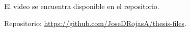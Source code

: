 \newpage
{}\label{appendix:Video de caso de uso}

El video se encuentra disponible en el repositorio.

\noindent Repositorio: \url{https://github.com/JoseDRojasA/thesis-files}.